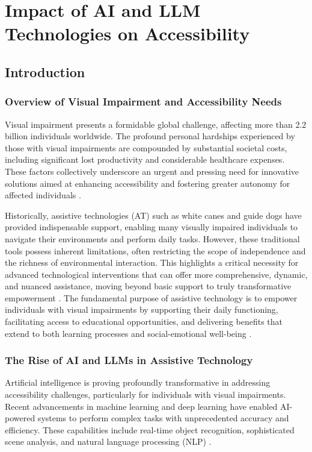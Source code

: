 \chapter{Impact of AI and LLM Technologies on Accessibility}\label{ch9:ai-llm}
\raggedright

\section{Introduction}\label{ch9:sec:introduction}

\subsection{Overview of Visual Impairment and Accessibility Needs}\label{ch9:ssec:overview}
Visual impairment presents a formidable global challenge, affecting more than 2.2 billion individuals worldwide. The profound personal hardships experienced by those with visual impairments are compounded by substantial societal costs, including significant lost productivity and considerable healthcare expenses. These factors collectively underscore an urgent and pressing need for innovative solutions aimed at enhancing accessibility and fostering greater autonomy for affected individuals \supercite{arxivvisualimpairment, WHO2021}.

Historically, assistive technologies (AT) such as white canes and guide dogs have provided indispensable support, enabling many visually impaired individuals to navigate their environments and perform daily tasks. However, these traditional tools possess inherent limitations, often restricting the scope of independence and the richness of environmental interaction. This highlights a critical necessity for advanced technological interventions that can offer more comprehensive, dynamic, and nuanced assistance, moving beyond basic support to truly transformative empowerment \supercite{aimodels2024}. The fundamental purpose of assistive technology is to empower individuals with visual impairments by supporting their daily functioning, facilitating access to educational opportunities, and delivering benefits that extend to both learning processes and social-emotional well-being \supercite{wjaets2024}.

\subsection{The Rise of AI and LLMs in Assistive Technology}\label{ch9:ssec:rise-of-ai}
Artificial intelligence is proving profoundly transformative in addressing accessibility challenges, particularly for individuals with visual impairments. Recent advancements in machine learning and deep learning have enabled AI-powered systems to perform complex tasks with unprecedented accuracy and efficiency. These capabilities include real-time object recognition, sophisticated scene analysis, and natural language processing (NLP) \supercite{arxivvisualimpairment}.

